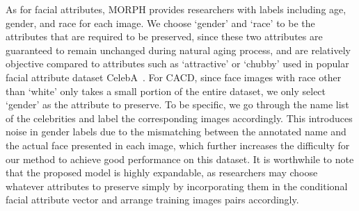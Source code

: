 \documentclass[10pt,twocolumn,letterpaper]{article}
\begin{document}
As for facial attributes, MORPH provides researchers with labels including age, gender, and race for each image. We choose `gender' and `race' to be the attributes that are required to be preserved, since these two attributes are guaranteed to remain unchanged during natural aging process, and are relatively objective compared to attributes such as `attractive' or `chubby' used in popular facial attribute dataset CelebA~\cite{liu2015faceattributes}.
For CACD, since face images with race other than `white' only takes a small portion of the entire dataset, we only select `gender' as the attribute to preserve. 
To be specific, we go through the name list of the celebrities and label the corresponding images accordingly. This introduces noise in gender labels due to the mismatching between the annotated name and the actual face presented in each image, which further increases the difficulty for our method to achieve good performance on this dataset.
It is worthwhile to note that the proposed model is highly expandable, as researchers may choose whatever attributes to preserve simply by incorporating them in the conditional facial attribute vector and arrange training images pairs accordingly.
\end{document}
